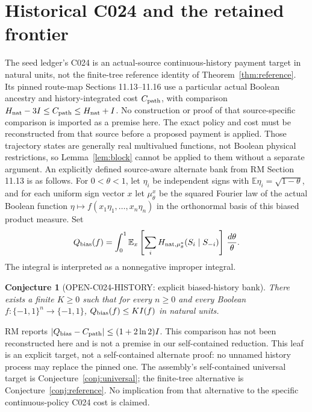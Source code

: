 \documentclass[11pt]{article}
\newtheorem{conjecture}[lemma]{Conjecture}
\newcommand{\E}{\mathbb E}
\begin{document}
\section{Historical C024 and the retained frontier}
The seed ledger's C024 is an actual-source continuous-history
payment target in natural units, not the finite-tree reference
identity of Theorem~\ref{thm:reference}. Its pinned route-map
Sections 11.13--11.16 use a particular actual Boolean ancestry and
history-integrated cost $C_{\rm path}$, with comparison
$H_{\rm nat}-3I\le C_{\rm path}\le H_{\rm nat}+I$.
No construction or proof of that source-specific comparison is
imported as a premise here. The exact policy and cost must be
reconstructed from that source before a proposed payment is applied.
Those trajectory states are generally real multivalued functions,
not Boolean physical restrictions, so Lemma~\ref{lem:block} cannot
be applied to them without a separate argument.
An explicitly defined source-aware alternate bank from RM Section
11.13 is as follows. For $0<\theta<1$, let $\eta_i$ be independent
signs with $\E\eta_i=\sqrt{1-\theta}$, and for each uniform sign
vector $x$ let $\mu_\theta^x$ be the squared Fourier law of the
actual Boolean function $\eta\mapsto f(x_1\eta_1,\ldots,x_n\eta_n)$
in the orthonormal basis of this biased product measure. Set
\[
Q_{\rm bias}(f)=\int_0^1\E_x\left[
\sum_i H_{\rm nat,\mu_\theta^x}(S_i\mid S_{-i})
\right]\,\frac{d\theta}{\theta}.
\]
The integral is interpreted as a nonnegative improper integral.
\begin{conjecture}[OPEN-C024-HISTORY: explicit biased-history bank]
There exists a finite $K\ge0$ such that for every $n\ge0$ and
every Boolean $f:\{-1,1\}^n\to\{-1,1\}$,
$Q_{\rm bias}(f)\le K I(f)$ in natural units.
\end{conjecture}
RM reports $|Q_{\rm bias}-C_{\rm path}|\le(1+2\ln2)I$.
This comparison has not been reconstructed here and is not a premise
in our self-contained reduction. This leaf is an explicit target,
not a self-contained alternate proof: no unnamed history process may
replace the pinned one.
The assembly's self-contained universal target is
Conjecture~\ref{conj:universal}; the finite-tree alternative is
Conjecture~\ref{conj:reference}. No implication from that alternative
to the specific continuous-policy C024 cost is claimed.
\end{document}
